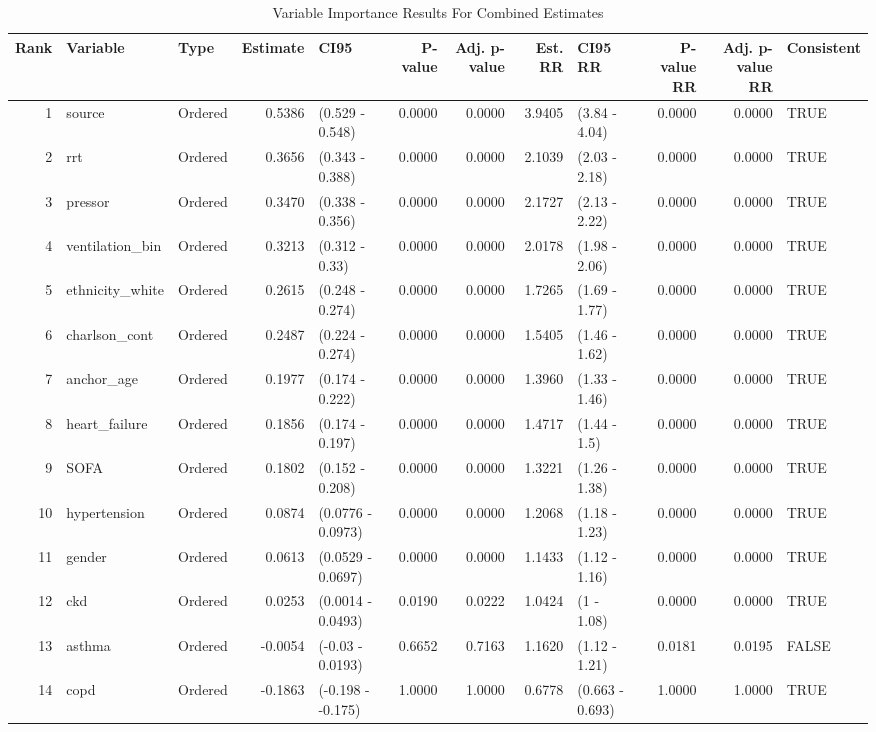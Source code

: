 \begin{table}[ht]
\centering
\caption{Variable Importance Results For Combined Estimates} 
\label{allRes}
\begin{tabular}{rllrlrrrlrrl}
  \hline
Rank & Variable & Type & Estimate & CI95 & P-value & Adj. p-value & Est. RR & CI95 RR & P-value RR & Adj. p-value RR & Consistent \\ 
  \hline
    1 & source & Ordered & 0.5386 & (0.529 - 0.548) & 0.0000 & 0.0000 & 3.9405 & (3.84 - 4.04) & 0.0000 & 0.0000 & TRUE \\ 
      2 & rrt & Ordered & 0.3656 & (0.343 - 0.388) & 0.0000 & 0.0000 & 2.1039 & (2.03 - 2.18) & 0.0000 & 0.0000 & TRUE \\ 
      3 & pressor & Ordered & 0.3470 & (0.338 - 0.356) & 0.0000 & 0.0000 & 2.1727 & (2.13 - 2.22) & 0.0000 & 0.0000 & TRUE \\ 
      4 & ventilation\_bin & Ordered & 0.3213 & (0.312 - 0.33) & 0.0000 & 0.0000 & 2.0178 & (1.98 - 2.06) & 0.0000 & 0.0000 & TRUE \\ 
      5 & ethnicity\_white & Ordered & 0.2615 & (0.248 - 0.274) & 0.0000 & 0.0000 & 1.7265 & (1.69 - 1.77) & 0.0000 & 0.0000 & TRUE \\ 
      6 & charlson\_cont & Ordered & 0.2487 & (0.224 - 0.274) & 0.0000 & 0.0000 & 1.5405 & (1.46 - 1.62) & 0.0000 & 0.0000 & TRUE \\ 
      7 & anchor\_age & Ordered & 0.1977 & (0.174 - 0.222) & 0.0000 & 0.0000 & 1.3960 & (1.33 - 1.46) & 0.0000 & 0.0000 & TRUE \\ 
      8 & heart\_failure & Ordered & 0.1856 & (0.174 - 0.197) & 0.0000 & 0.0000 & 1.4717 & (1.44 - 1.5) & 0.0000 & 0.0000 & TRUE \\ 
      9 & SOFA & Ordered & 0.1802 & (0.152 - 0.208) & 0.0000 & 0.0000 & 1.3221 & (1.26 - 1.38) & 0.0000 & 0.0000 & TRUE \\ 
     10 & hypertension & Ordered & 0.0874 & (0.0776 - 0.0973) & 0.0000 & 0.0000 & 1.2068 & (1.18 - 1.23) & 0.0000 & 0.0000 & TRUE \\ 
     11 & gender & Ordered & 0.0613 & (0.0529 - 0.0697) & 0.0000 & 0.0000 & 1.1433 & (1.12 - 1.16) & 0.0000 & 0.0000 & TRUE \\ 
     12 & ckd & Ordered & 0.0253 & (0.0014 - 0.0493) & 0.0190 & 0.0222 & 1.0424 & (1 - 1.08) & 0.0000 & 0.0000 & TRUE \\ 
   \hline
   13 & asthma & Ordered & -0.0054 & (-0.03 - 0.0193) & 0.6652 & 0.7163 & 1.1620 & (1.12 - 1.21) & 0.0181 & 0.0195 & FALSE \\ 
     14 & copd & Ordered & -0.1863 & (-0.198 - -0.175) & 1.0000 & 1.0000 & 0.6778 & (0.663 - 0.693) & 1.0000 & 1.0000 & TRUE \\ 
   \hline
\end{tabular}
\end{table}
